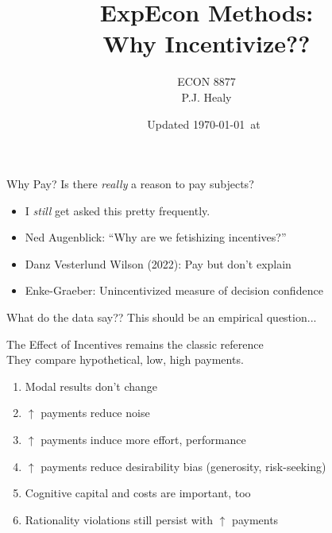 

\title[Incentives: History]{ExpEcon Methods:\\Why Incentivize??}
\author[ECON 8877]{ECON 8877\\P.J. Healy} \color{metrop}
\institute[OSU]{}
\date[]{\vfill {\tiny Updated \today\ at\ \DTMcurrenttime}}




\frame{\maketitle}

\begin{frame}{Why Pay?}
    Is there \emph{really} a reason to pay subjects?
    \begin{itemize}
        \item I \emph{still} get asked this pretty frequently.
        \item Ned Augenblick: ``Why are we fetishizing incentives?''
        \item Danz Vesterlund Wilson (2022): Pay but don't explain
        \item Enke-Graeber: Unincentivized measure of decision confidence
    \end{itemize}
    \br
    What do the data say?? This should be an empirical question...
\end{frame}

\begin{frame}{The Effect of Incentives}
\citet{CamererHogarth1999} remains the classic reference\\
They compare hypothetical, low, high payments.
\begin{enumerate}
    \item Modal results don't change
    \item $\uparrow$ payments reduce noise
    \item $\uparrow$ payments induce more effort, performance
    \item $\uparrow$ payments reduce desirability bias (generosity, risk-seeking)
    \item Cognitive capital and costs are important, too
    \item Rationality violations still persist with $\uparrow$ payments
\end{enumerate}
\end{frame}

